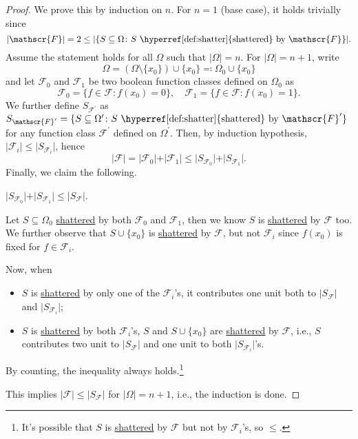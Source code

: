 \begin{proof}
  We prove this by induction on \(n\). For \(n = 1\) (base case), it holds trivially since
  \[
    \vert \mathscr{F} \vert = 2 \leq \vert \{ S \subseteq \Omega \colon S \text{ \hyperref[def:shatter]{shattered} by } \mathscr{F} \} \vert.
  \]
  Assume the statement holds for all \(\Omega \) such that \(\vert \Omega \vert = n\). For \(\vert \Omega \vert = n+1\), write
  \[
    \Omega = (\Omega \setminus \{ x_0 \} ) \cup \{ x_0 \} \eqqcolon \Omega _0 \cup \{ x_0 \}
  \]
  and let \(\mathscr{F} _0\) and \(\mathscr{F} _1\) be two boolean function classes defined on \(\Omega _0\) as
  \[
    \mathscr{F} _0 = \{ f\in \mathscr{F} \colon f(x_0) = 0\} ,\quad
    \mathscr{F} _1 = \{ f\in \mathscr{F} \colon f(x_0) = 1\} .
  \]
  We further define \(S_{\mathscr{F} ^{\prime} }\) as \(S_{\mathscr{F} ^{\prime} } = \{ S \subseteq \Omega ^{\prime} \colon S \text{ \hyperref[def:shatter]{shattered} by } \mathscr{F} ^{\prime} \}\) for any function class \(\mathscr{F} ^{\prime} \) defined on \(\Omega ^{\prime} \). Then, by induction hypothesis, \(\vert \mathscr{F} _i \vert \leq \vert S_{\mathscr{F} _i} \vert \), hence
  \[
    \vert \mathscr{F} \vert
    = \vert \mathscr{F} _0 \vert + \vert \mathscr{F} _1 \vert
    \leq \vert S_{\mathscr{F} _0} \vert + \vert S_{\mathscr{F} _1} \vert.
  \]
  Finally, we claim the following.

  \begin{claim}
    \(\vert S_{\mathscr{F} _0} \vert + \vert S_{\mathscr{F} _1} \vert \leq \vert S _{\mathscr{F} } \vert\).
  \end{claim}
  \begin{explanation}
    Let \(S \subseteq \Omega _0\) \hyperref[def:shatter]{shattered} by both \(\mathscr{F} _0\) and \(\mathscr{F} _1\), then we know \(S\) is \hyperref[def:shatter]{shattered} by \(\mathscr{F} \) too. We further observe that \(S \cup \{ x_0 \} \) is \hyperref[def:shatter]{shattered} by \(\mathscr{F} \), but not \(\mathscr{F} _i\) since \(f(x_0)\) is fixed for \(f\in \mathscr{F} _i\).

    Now, when
    \begin{itemize}
      \item \(S\) is \hyperref[def:shatter]{shattered} by only one of the \(\mathscr{F} _i\)'s, it contributes one unit both to \(\vert S_{\mathscr{F} } \vert \) and \(\vert S_{\mathscr{F} _i} \vert \);
      \item \(S\) is \hyperref[def:shatter]{shattered} by both \(\mathscr{F} _i\)'s, \(S\) and \(S \cup \{ x_0 \} \) are \hyperref[def:shatter]{shattered} by \(\mathscr{F} \), i.e., \(S\) contributes two unit to \(\vert S_{\mathscr{F} } \vert \) and one unit to both \(\vert S_{\mathscr{F} _i} \vert \)'s.
    \end{itemize}
    By counting, the inequality always holds.\footnote{It's possible that \(S\) is \hyperref[def:shatter]{shattered} by \(\mathscr{F} \) but not by \(\mathscr{F} _i\)'s, so \(\leq \).}
  \end{explanation}

  This implies \(\vert \mathscr{F} \vert \leq \vert S_{\mathscr{F} } \vert \) for \(\vert \Omega \vert = n+1\), i.e., the induction is done.
\end{proof}

